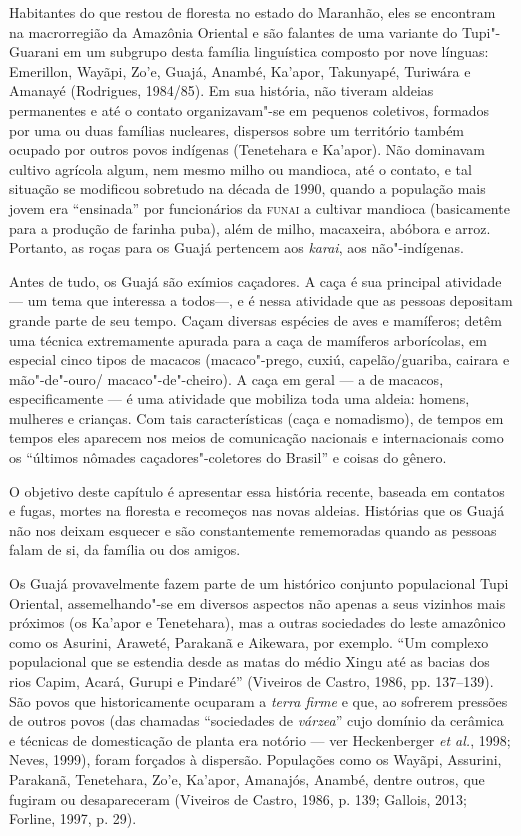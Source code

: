Habitantes do que restou de floresta no estado do Maranhão, eles se
encontram na macrorregião da Amazônia Oriental e são falantes de uma
variante do Tupi"-Guarani em um subgrupo desta família linguística
composto por nove línguas: Emerillon, Wayãpi, Zo'e, Guajá, Anambé,
Ka'apor, Takunyapé, Turiwára e Amanayé (Rodrigues, 1984/85). Em sua
história, não tiveram aldeias permanentes e até o contato organizavam"-se
em pequenos coletivos, formados por uma ou duas famílias nucleares,
dispersos sobre um território também ocupado por outros povos indígenas
(Tenetehara e Ka'apor). Não dominavam cultivo agrícola algum, nem mesmo
milho ou mandioca, até o contato, e tal situação se modificou sobretudo
na década de 1990, quando a população mais jovem era ``ensinada''
por funcionários da \textsc{funai} a cultivar mandioca (basicamente para a
produção de farinha puba), além de milho, macaxeira, abóbora e arroz.
Portanto, as roças para os Guajá pertencem aos \emph{karai}, aos
não"-indígenas.

Antes de tudo, os Guajá são exímios caçadores. A caça é sua principal
atividade --- um tema que interessa a todos---, e é nessa atividade que as
pessoas depositam grande parte de seu tempo. Caçam diversas espécies de
aves e mamíferos; detêm uma técnica extremamente apurada para a caça de
mamíferos arborícolas, em especial cinco tipos de macacos (macaco"-prego,
cuxiú, capelão/guariba, cairara e mão"-de"-ouro/
macaco"-de"-cheiro). A caça em geral --- a de macacos, especificamente --- é
uma atividade que mobiliza toda uma aldeia: homens, mulheres e crianças.
Com tais características (caça e nomadismo), de tempos em tempos eles
aparecem nos meios de comunicação nacionais e internacionais como os
``últimos nômades caçadores"-coletores do Brasil'' e coisas do gênero.

O objetivo deste capítulo é apresentar essa história recente, baseada em
contatos e fugas, mortes na floresta e recomeços nas novas aldeias.
Histórias que os Guajá não nos deixam esquecer e são constantemente
rememoradas quando as pessoas falam de si, da família ou dos amigos.

Os Guajá provavelmente fazem parte de um histórico conjunto populacional
Tupi Oriental, assemelhando"-se em diversos aspectos não apenas a seus
vizinhos mais próximos (os Ka'apor e Tenetehara), mas a outras
sociedades do leste amazônico como os Asurini, Araweté, Parakanã e
Aikewara, por exemplo. ``Um complexo populacional que se estendia desde
as matas do médio Xingu até as bacias dos rios Capim, Acará, Gurupi e
Pindaré'' (Viveiros de Castro, 1986, pp. 137--139). São povos que
historicamente ocuparam a \emph{terra firme} e que, ao sofrerem pressões
de outros povos (das chamadas ``sociedades de \emph{várzea}'' cujo
domínio da cerâmica e técnicas de domesticação de planta era notório ---
ver Heckenberger \emph{et al.}, 1998; Neves, 1999), foram forçados à dispersão.
Populações como os Wayãpi, Assurini, Parakanã, Tenetehara, Zo'e,
Ka'apor, Amanajós, Anambé, dentre outros, que fugiram ou desapareceram
(Viveiros de Castro, 1986, p. 139; Gallois, 2013; Forline, 1997, p. 29).

